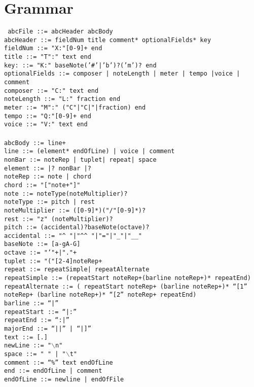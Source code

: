 \documentclass{article}
\begin{document}
\section{Grammar}
	{\tt
	abcFile ::= abcHeader abcBody\\
	abcHeader ::= fieldNum title comment* optionalFields* key\\
	fieldNum ::= "X:"[0-9]+ end\\
	title ::= "T":" text end\\
	key: ::= "K:" baseNote('\#'|'b')?('m')? end\\
	optionalFields ::= composer | noteLength | meter | tempo |voice | comment\\
	composer ::= "C:" text end\\
	noteLength ::= "L:" fraction end\\
	meter ::= "M":" ("C"|"C|"|fraction) end\\
	tempo ::= "Q:"[0-9]+ end\\
	voice ::= "V:" text end\\\\
	abcBody ::= line+\\
	line ::= (element* endOfLine) | voice | comment\\
	nonBar ::= noteRep | tuplet| repeat| space \\
	element ::= |? nonBar |?\\
	noteRep ::= note | chord\\
	chord ::= "["note+"]"\\
	note ::= noteType(noteMultiplier)?\\
	noteType ::= pitch | rest\\
	noteMultiplier ::= ([0-9]*)("/"[0-9]*)?\\
	rest ::= "z" (noteMultiplier)?\\
	pitch ::= (accidental)?baseNote(octave)?\\}
{\tt accidental ::= "\^{ } "|"\^{ }\^{ } "|"="|"\_"|"\_\_" } \\
	{\tt baseNote ::= [a-gA-G]\\
	octave ::= "'"+|"."+\\
	tuplet ::= "("[2-4]noteRep+\\
	repeat ::= repeatSimple| repeatAlternate\\
	repeatSimple ::= (repeatStart noteRep+(barline noteRep+)* repeatEnd)\\
	repeatAlternate ::= ( repeatStart  noteRep+ (barline noteRep+)* “[1”\\ noteRep+ (barline noteRep+)* “[2” noteRep+ repeatEnd)\\
	barline ::= “|”\\
	repeatStart ::= “|:”\\
	repeatEnd ::= “:|”\\
	majorEnd ::= “||” | “|]”\\
	text ::= [.]\\
	newLine ::=  "$\backslash$n" \\
	space ::= " " | "$\backslash$t" \\
	comment ::= “\%” text endOfLine\\
	end ::= endOfLine | comment\\
	endOfLine ::= newline | endOfFile\\
	}
\end{document}
